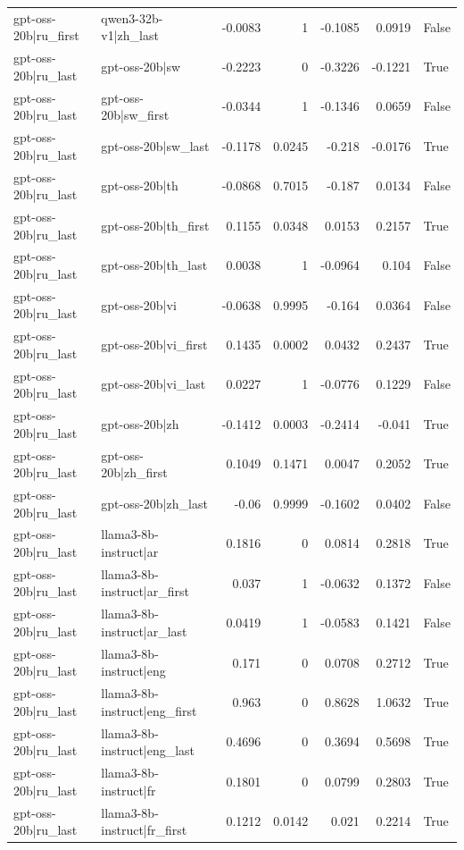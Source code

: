 \begin{table}
\begin{tabular}{l l r r r r l}
gpt-oss-20b|ru_first & qwen3-32b-v1|zh_last & -0.0083 & 1 & -0.1085 & 0.0919 & False \\
gpt-oss-20b|ru_last & gpt-oss-20b|sw & -0.2223 & 0 & -0.3226 & -0.1221 & True \\
gpt-oss-20b|ru_last & gpt-oss-20b|sw_first & -0.0344 & 1 & -0.1346 & 0.0659 & False \\
gpt-oss-20b|ru_last & gpt-oss-20b|sw_last & -0.1178 & 0.0245 & -0.218 & -0.0176 & True \\
gpt-oss-20b|ru_last & gpt-oss-20b|th & -0.0868 & 0.7015 & -0.187 & 0.0134 & False \\
gpt-oss-20b|ru_last & gpt-oss-20b|th_first & 0.1155 & 0.0348 & 0.0153 & 0.2157 & True \\
gpt-oss-20b|ru_last & gpt-oss-20b|th_last & 0.0038 & 1 & -0.0964 & 0.104 & False \\
gpt-oss-20b|ru_last & gpt-oss-20b|vi & -0.0638 & 0.9995 & -0.164 & 0.0364 & False \\
gpt-oss-20b|ru_last & gpt-oss-20b|vi_first & 0.1435 & 0.0002 & 0.0432 & 0.2437 & True \\
gpt-oss-20b|ru_last & gpt-oss-20b|vi_last & 0.0227 & 1 & -0.0776 & 0.1229 & False \\
gpt-oss-20b|ru_last & gpt-oss-20b|zh & -0.1412 & 0.0003 & -0.2414 & -0.041 & True \\
gpt-oss-20b|ru_last & gpt-oss-20b|zh_first & 0.1049 & 0.1471 & 0.0047 & 0.2052 & True \\
gpt-oss-20b|ru_last & gpt-oss-20b|zh_last & -0.06 & 0.9999 & -0.1602 & 0.0402 & False \\
gpt-oss-20b|ru_last & llama3-8b-instruct|ar & 0.1816 & 0 & 0.0814 & 0.2818 & True \\
gpt-oss-20b|ru_last & llama3-8b-instruct|ar_first & 0.037 & 1 & -0.0632 & 0.1372 & False \\
gpt-oss-20b|ru_last & llama3-8b-instruct|ar_last & 0.0419 & 1 & -0.0583 & 0.1421 & False \\
gpt-oss-20b|ru_last & llama3-8b-instruct|eng & 0.171 & 0 & 0.0708 & 0.2712 & True \\
gpt-oss-20b|ru_last & llama3-8b-instruct|eng_first & 0.963 & 0 & 0.8628 & 1.0632 & True \\
gpt-oss-20b|ru_last & llama3-8b-instruct|eng_last & 0.4696 & 0 & 0.3694 & 0.5698 & True \\
gpt-oss-20b|ru_last & llama3-8b-instruct|fr & 0.1801 & 0 & 0.0799 & 0.2803 & True \\
gpt-oss-20b|ru_last & llama3-8b-instruct|fr_first & 0.1212 & 0.0142 & 0.021 & 0.2214 & True \\

\end{tabular}
\end{table}
